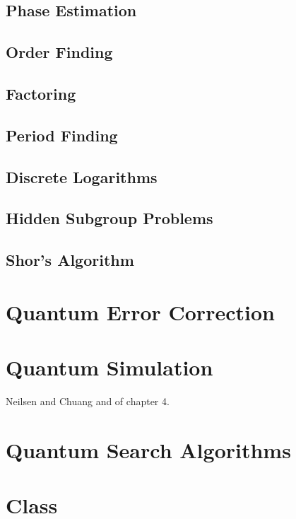 \documentclass{article}
\begin{document}
  \subsection{Phase Estimation}

  \subsection{Order Finding}

  \subsection{Factoring}

  \subsection{Period Finding} 

  \subsection{Discrete Logarithms}

  \subsection{Hidden Subgroup Problems}

  \subsection{Shor's Algorithm}


\section{Quantum Error Correction}


\section{Quantum Simulation}

  Neilsen and Chuang and of chapter 4. 

\section{Quantum Search Algorithms}


\section{Class} 
  
\end{document}
